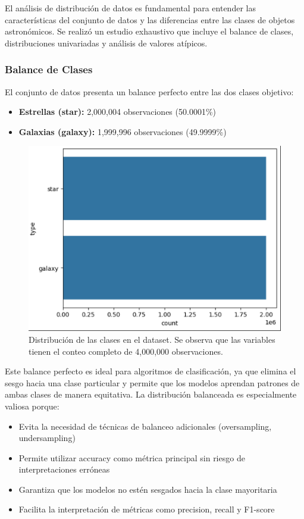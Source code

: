 \documentclass{article}
\begin{document}
El análisis de distribución de datos es fundamental para entender las características del conjunto de datos y las diferencias entre las clases de objetos astronómicos. Se realizó un estudio exhaustivo que incluye el balance de clases, distribuciones univariadas y análisis de valores atípicos.

\subsubsection{Balance de Clases}

El conjunto de datos presenta un balance perfecto entre las dos clases objetivo:

\begin{itemize}
    \item \textbf{Estrellas (star):} 2,000,004 observaciones (50.0001\%)
    \item \textbf{Galaxias (galaxy):} 1,999,996 observaciones (49.9999\%)
\end{itemize}

\begin{figure}[H]
    \centering
    \includegraphics[width=0.5\linewidth]{count.png}
    \caption{Distribución de las clases en el dataset. Se observa que las variables tienen el conteo completo de 4,000,000 observaciones.}
    \label{fig:count}
\end{figure}


Este balance perfecto es ideal para algoritmos de clasificación, ya que elimina el sesgo hacia una clase particular y permite que los modelos aprendan patrones de ambas clases de manera equitativa. La distribución balanceada es especialmente valiosa porque:

\begin{itemize}
    \item Evita la necesidad de técnicas de balanceo adicionales (oversampling, undersampling)
    \item Permite utilizar accuracy como métrica principal sin riesgo de interpretaciones erróneas
    \item Garantiza que los modelos no estén sesgados hacia la clase mayoritaria
    \item Facilita la interpretación de métricas como precision, recall y F1-score
\end{itemize}
\end{document}

